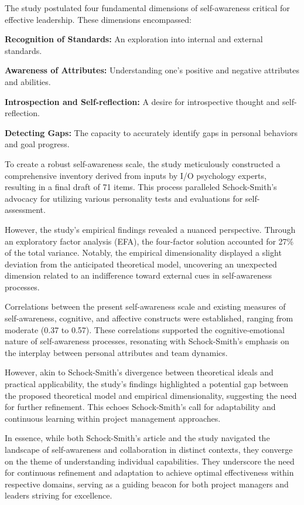 \documentclass[runningheads]{llncs}
\begin{document}
The study postulated four fundamental dimensions of self-awareness critical for effective leadership. These dimensions encompassed:

\textbf{Recognition of Standards:} An exploration into internal and external standards.

\textbf{Awareness of Attributes:} Understanding one's positive and negative attributes and abilities.

\textbf{Introspection and Self-reflection:} A desire for introspective thought and self-reflection.

\textbf{Detecting Gaps:} The capacity to accurately identify gaps in personal behaviors and goal progress.

To create a robust self-awareness scale, the study meticulously constructed a comprehensive inventory derived from inputs by I/O psychology experts, resulting in a final draft of 71 items. This process paralleled Schock-Smith's advocacy for utilizing various personality tests and evaluations for self-assessment.

However, the study's empirical findings revealed a nuanced perspective. Through an exploratory factor analysis (EFA), the four-factor solution accounted for 27\% of the total variance. Notably, the empirical dimensionality displayed a slight deviation from the anticipated theoretical model, uncovering an unexpected dimension related to an indifference toward external cues in self-awareness processes.

Correlations between the present self-awareness scale and existing measures of self-awareness, cognitive, and affective constructs were established, ranging from moderate (0.37 to 0.57). These correlations supported the cognitive-emotional nature of self-awareness processes, resonating with Schock-Smith's emphasis on the interplay between personal attributes and team dynamics.

However, akin to Schock-Smith's divergence between theoretical ideals and practical applicability, the study's findings highlighted a potential gap between the proposed theoretical model and empirical dimensionality, suggesting the need for further refinement. This echoes Schock-Smith's call for adaptability and continuous learning within project management approaches.

In essence, while both Schock-Smith's article and the study navigated the landscape of self-awareness and collaboration in distinct contexts, they converge on the theme of understanding individual capabilities. They underscore the need for continuous refinement and adaptation to achieve optimal effectiveness within respective domains, serving as a guiding beacon for both project managers and leaders striving for excellence.
\end{document}
